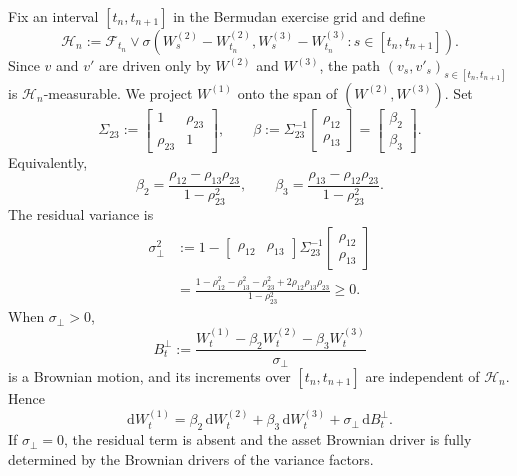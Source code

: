 \documentclass[pdflatex,sn-mathphys-num]{sn-jnl}
\theoremstyle{thmstyleone}%
\theoremstyle{thmstylethree}%
\theoremstyle{thmstyletwo}%
\newcommand{\dd}{\mathrm d}
\newcommand{\F}{\mathcal F}
\begin{document}
Fix an interval $[t_n,t_{n+1}]$ in the Bermudan exercise grid and define
$$
\mathcal H_n
:=
\F_{t_n}
\vee
\sigma\!\left(
W_s^{(2)}-W_{t_n}^{(2)},
W_s^{(3)}-W_{t_n}^{(3)}
: s\in[t_n,t_{n+1}]
\right).
$$
Since $v$ and $v'$ are driven only by $W^{(2)}$ and $W^{(3)}$, the path
$(v_s,v'_s)_{s\in[t_n,t_{n+1}]}$ is $\mathcal H_n$-measurable. We project
$W^{(1)}$ onto the span of $(W^{(2)},W^{(3)})$. Set
$$
\Sigma_{23}:=
\begin{bmatrix}
1 & \rho_{23}\\
\rho_{23} & 1
\end{bmatrix},
\qquad
\beta:=\Sigma_{23}^{-1}
\begin{bmatrix}
\rho_{12}\\
\rho_{13}
\end{bmatrix}
=
\begin{bmatrix}
\beta_2\\
\beta_3
\end{bmatrix}.
$$
Equivalently,
\begin{equation}\label{eq:proj-coeffs}
\beta_2=\frac{\rho_{12}-\rho_{13}\rho_{23}}{1-\rho_{23}^2},
\qquad
\beta_3=\frac{\rho_{13}-\rho_{12}\rho_{23}}{1-\rho_{23}^2}.
\end{equation}
The residual variance is
\begin{equation}\label{eq:sigperp}
\begin{aligned}
\sigma_\perp^2
&:=
1-
\begin{bmatrix}\rho_{12}&\rho_{13}\end{bmatrix}
\Sigma_{23}^{-1}
\begin{bmatrix}\rho_{12}\\ \rho_{13}\end{bmatrix} \\
&=
\frac{
1-\rho_{12}^2-\rho_{13}^2-\rho_{23}^2
+2\rho_{12}\rho_{13}\rho_{23}
}{1-\rho_{23}^2}
\ge0 .
\end{aligned}
\end{equation}
When $\sigma_\perp>0$,
$$
B_t^\perp
:=
\frac{W_t^{(1)}-\beta_2W_t^{(2)}-\beta_3W_t^{(3)}}{\sigma_\perp}
$$
is a Brownian motion, and its increments over $[t_n,t_{n+1}]$ are independent
of $\mathcal H_n$. Hence
\begin{equation}\label{eq:orth}
\dd W_t^{(1)}
=\beta_2\,\dd W_t^{(2)}
+\beta_3\,\dd W_t^{(3)}
+\sigma_\perp\,\dd B_t^\perp.
\end{equation}
If $\sigma_\perp=0$, the residual term is absent and the asset Brownian driver
is fully determined by the Brownian drivers of the variance factors.
\end{document}
